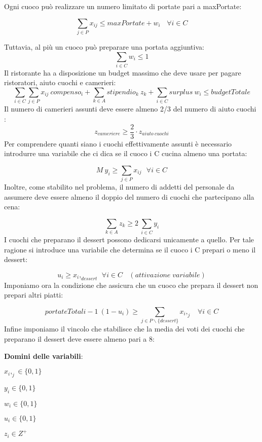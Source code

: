 \documentclass[../modello-progetto.tex]{subfiles}
\begin{document}
\noindent Ogni cuoco può realizzare un numero limitato di portate pari a maxPortate:

\[
	\sum_{j \in P} x_{ij} \leq  maxPortate + w_i \: \: \: \: \forall i \in C
\]

\noindent Tuttavia, al più un cuoco può preparare una portata aggiuntiva:
\[
	\sum_{ i \in C} w_i \leq 1
\]
Il ristorante ha a disposizione un budget massimo che deve usare per pagare ristoratori, aiuto cuochi e camerieri:
\[
	\sum_{i \in C} \sum_{j \in P} x_{ij} \: compenso_i+ \sum_{k \in A} stipendio_k \: z_k + \sum_{i \in C}surplus \: w_i \leq budgetTotale
\]
Il numero di camerieri assunti deve essere almeno 2/3 del numero di aiuto cuochi :
\[
	z_{cameriere} \geq  \frac{2}{3} \cdot z_{aiuto\:cuochi}
\]
Per comprendere quanti siano i cuochi effettivamente assunti è necessario introdurre una variabile che ci dica se il cuoco i \in C cucina almeno una portata:

\[
	M \: y_i \geq \sum_{j \in P} x_{ij} \: \: \: \forall i \in C
\]
Inoltre, come stabilito nel problema, il numero di addetti del personale da assumere  deve essere almeno il doppio del numero di cuochi che partecipano alla cena:

\[
	\sum_{k \in A} z_k \geq 2 \: \sum_{i \in C} y_i
\]
I cuochi che preparano il dessert possono dedicarsi unicamente a quello. Per tale ragione si introduce una variabile che determina se il cuoco i \in C prepari o meno il dessert:

\[
	u_i \geq x_i,_{dessert} \: \: \forall i \in C  \: \: \: \: (attivazione \; variabile)
\]
Imponiamo ora la condizione che assicura che un cuoco che prepara il dessert non prepari altri piatti:

\[
	portateTotali - 1 \: (1-u_i) \geq \sum_{j \in P \backslash \{dessert\}} x_i,_j \: \: \: \: \forall i \in C
\]
Infine imponiamo il vincolo che stabilisce che la media dei voti dei cuochi che preparano il dessert deve essere almeno pari a 8:


\textbf{Domini delle variabili}:
\begin{center}
	$ x_i,_j  \in \{0,1\} $

	$ y_i \in \{0,1\} $

	$ w_i  \in \{0,1\} $

	$ u_i  \in \{0,1\} $

	$ z_i  \in {Z}^+ $

 \end{center}
\end{document}
